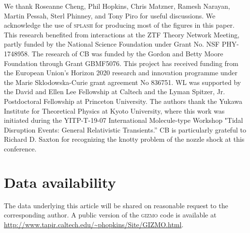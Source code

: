 \documentclass[a4paper,fleqn,usenatbib]{mnras}
\begin{document}
We thank Roseanne Cheng, Phil Hopkins, Chris Matzner, Ramesh Narayan, Martin Pessah, Sterl Phinney, and Tony Piro for useful discussions. We acknowledge the use of \textsc{splash} \citep{price2007} for producing most of the figures in this paper. This research benefited from interactions at the ZTF Theory Network Meeting, partly funded by the National Science Foundation under Grant No. NSF PHY-1748958. The research of CB was funded by the Gordon and Betty Moore Foundation through Grant GBMF5076. This project has received funding from the European Union’s Horizon 2020 research and innovation programme under the Marie Sklodowska-Curie grant agreement No 836751. WL was supported by the David and Ellen Lee Fellowship at Caltech and the Lyman Spitzer, Jr. Postdoctoral Fellowship at Princeton University. The authors thank the Yukawa Institute for Theoretical Physics at Kyoto University, where this work was initiated during the YITP-T-19-07 International Molecule-type Workshop "Tidal Disruption Events: General Relativistic Transients.” CB is particularly grateful to Richard D. Saxton for recognizing the knotty problem of the nozzle shock at this conference.


\section*{Data availability}

The data underlying this article will be shared on reasonable request to the corresponding author. A public version of
the \textsc{gizmo} code is available at \url{http://www.tapir.caltech.edu/~phopkins/Site/GIZMO.html}.





 






\bsp	%
\label{lastpage}


\end{document}
